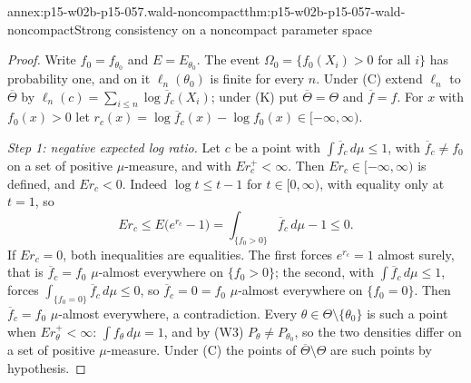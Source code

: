 \begin{annexitem}{annex:p15-w02b-p15-057.wald-noncompact}{thm:p15-w02b-p15-057-wald-noncompact}{Strong consistency on a noncompact parameter space}
\begin{proof}
Write \(f_0=f_{\theta_0}\) and \(E=E_{\theta_0}\). The event
\(\Omega_0=\{f_0(X_i)>0\text{ for all }i\}\) has probability one, and on it
\(\ell_n(\theta_0)\) is finite for every \(n\). Under (C) extend \(\ell_n\)
to \(\overline\Theta\) by \(\ell_n(c)=\sum_{i\leq n}\log\overline f_c(X_i)\);
under (K) put \(\overline\Theta=\Theta\) and \(\overline f=f\). For
\(x\) with \(f_0(x)>0\) let
\(r_c(x)=\log\overline f_c(x)-\log f_0(x)\in[-\infty,\infty)\).

\emph{Step 1: negative expected log ratio.} Let \(c\) be a point with
\(\int\overline f_c\,d\mu\leq1\), with \(\overline f_c\neq f_0\) on a set of
positive \(\mu\)-measure, and with \(Er_c^+<\infty\). Then
\(Er_c\in[-\infty,\infty)\) is defined, and \(Er_c<0\). Indeed
\(\log t\leq t-1\) for \(t\in[0,\infty)\), with equality only at \(t=1\), so
\[
 Er_c\leq E\bigl(e^{r_c}-1\bigr)=\int_{\{f_0>0\}}\overline f_c\,d\mu-1\leq0 .
\]
If \(Er_c=0\), both inequalities are equalities. The first forces
\(e^{r_c}=1\) almost surely, that is \(\overline f_c=f_0\) \(\mu\)-almost
everywhere on \(\{f_0>0\}\); the second, with
\(\int\overline f_c\,d\mu\leq1\), forces \(\int_{\{f_0=0\}}\overline
f_c\,d\mu\leq0\), so \(\overline f_c=0=f_0\) \(\mu\)-almost everywhere on
\(\{f_0=0\}\). Then \(\overline f_c=f_0\) \(\mu\)-almost everywhere, a
contradiction. Every \(\theta\in\Theta\setminus\{\theta_0\}\) is such a
point when \(Er_\theta^+<\infty\): \(\int f_\theta\,d\mu=1\), and by (W3)
\(P_\theta\neq P_{\theta_0}\), so the two densities differ on a set of
positive \(\mu\)-measure. Under (C) the points of
\(\overline\Theta\setminus\Theta\) are such points by hypothesis.


\end{proof}
\end{annexitem}
